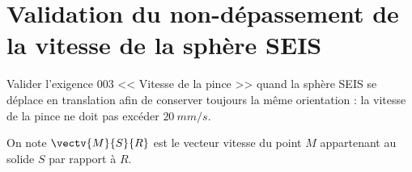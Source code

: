 \section{Validation du non-dépassement de la vitesse de la sphère SEIS}

\begin{obj}
Valider l’exigence 003 << Vitesse de la pince >> quand la sphère SEIS se déplace en 
translation afin de conserver toujours la même orientation : la vitesse de la pince ne doit pas excéder $\SI{20}{mm/s}$.
\end{obj}

On note $\vectv{M}{S}{R}$ est le vecteur vitesse du point $M$ appartenant au solide $S$ par rapport à $R$.




